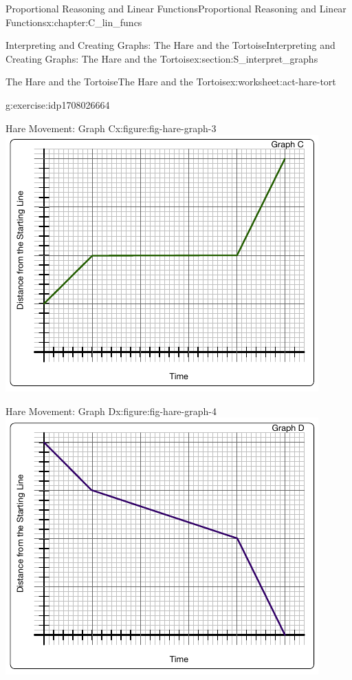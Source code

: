 \documentclass[oneside,10pt,]{book}
\numberwithin{equation}{chapter}
\begin{document}
\begin{chapterptx}{Proportional Reasoning and Linear Functions}{}{Proportional Reasoning and Linear Functions}{}{}{x:chapter:C_lin_funcs}
\begin{sectionptx}{Interpreting and Creating Graphs: The Hare and the Tortoise}{}{Interpreting and Creating Graphs: The Hare and the Tortoise}{}{}{x:section:S_interpret_graphs}
\begin{worksheet-subsection}{The Hare and the Tortoise}{}{The Hare and the Tortoise}{}{}{x:worksheet:act-hare-tort}
\begin{divisionexercise}{2}{}{}{g:exercise:idp1708026664}
\begin{sidebyside}{2}{0}{0}{0}%
\begin{sbspanel}{0.5}%
\begin{figureptx}{Hare Movement: Graph C}{x:figure:fig-hare-graph-3}{}%
\includegraphics[width=\linewidth]{external/hare-graph-3.pdf}
\tcblower
\end{figureptx}%
\end{sbspanel}%
\begin{sbspanel}{0.5}%
\begin{figureptx}{Hare Movement: Graph D}{x:figure:fig-hare-graph-4}{}%
\includegraphics[width=\linewidth]{external/hare-graph-4.pdf}

\end{figureptx}
\end{sbspanel}
\end{sidebyside}
\end{divisionexercise}
\end{worksheet-subsection}
\end{sectionptx}
\end{chapterptx}
\end{document}
